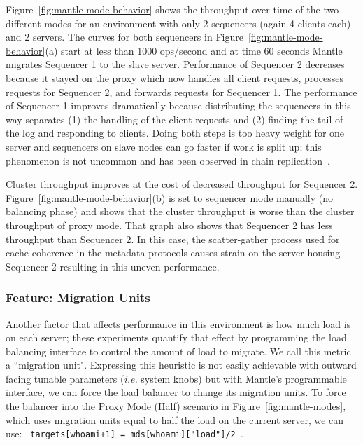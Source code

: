 Figure~\ref{fig:mantle-mode-behavior} shows the throughput over time of the two
different modes for an environment with only 2 sequencers (again 4 clients
each) and 2 servers. The curves for both sequencers in
Figure~\ref{fig:mantle-mode-behavior}(a) start at less than 1000 ops/second and
at time 60 seconds Mantle migrates Sequencer 1 to the slave server.
Performance of Sequencer 2 decreases because it stayed on the proxy which now
handles all client requests, processes requests for Sequencer 2, and forwards
requests for Sequencer 1. The performance of Sequencer 1 improves dramatically
because distributing the sequencers in this way separates (1) the handling of
the client requests and (2) finding the tail of the log and responding to
clients.  Doing both steps is too heavy weight for one server and sequencers on
slave nodes can go faster if work is split up; this phenomenon is not uncommon
and has been observed in chain replication~\cite{chain_rep}.

Cluster throughput improves at the cost of decreased throughput for Sequencer
2.  Figure~\ref{fig:mantle-mode-behavior}(b) is set to sequencer mode manually
(no balancing phase) and shows that the cluster throughput is worse than the
cluster throughput of proxy mode. That graph also shows that Sequencer 2 has
less throughput than Sequencer 2. In this case, the scatter-gather process used
for cache coherence in the metadata protocols causes strain on the server
housing Sequencer 2 resulting in this uneven performance. 

\subsubsection{Feature: Migration Units}
\label{sec:feature-migration-units}

Another factor that affects performance in this environment is how much load is
on each server; these experiments quantify that effect by programming the load
balancing interface to control the amount of load to migrate. We call this
metric a ``migration unit".  Expressing this heuristic is not easily achievable
with outward facing tunable parameters ({\it i.e.} system knobs) but with Mantle's
programmable interface, we can force the load balancer to change its migration
units. To force the balancer into the Proxy Mode (Half) scenario in
Figure~\ref{fig:mantle-modes}, which uses migration units equal to half the
load on the current server, we can use: \texttt{ targets[whoami+1] =
mds[whoami]["load"]/2 }.

